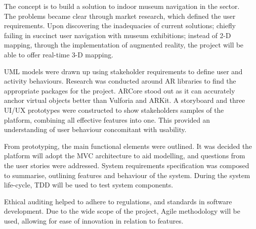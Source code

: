 
The concept is to build a solution to indoor museum navigation in the sector. The problems became clear through market research, which defined the user requirements. Upon discovering the inadequacies of current solutions; chiefly failing in succinct user navigation with museum exhibitions; instead of 2-D mapping, through the implementation of augmented reality, the project will be able to offer real-time 3-D mapping.

UML models were drawn up using stakeholder requirements to define user and activity behaviours. Research was conducted around AR libraries to find the appropriate packages for the project. ARCore stood out as it can accurately anchor virtual objects better than Vulforia and ARKit. A storyboard and three UI/UX prototypes were constructed to show stakeholders samples of the platform, combining all effective features into one. This provided an understanding of user behaviour concomitant with usability.  

From prototyping, the main functional elements were outlined. It was decided the platform will adopt the MVC architecture to aid modelling, and questions from the user stories were addressed. System requirements specification was composed to summarise, outlining features and behaviour of the system. During the system life-cycle, TDD will be used to test system components.  

Ethical auditing helped to adhere to regulations, and standards in software development. Due to the wide scope of the project, Agile methodology will be used, allowing for ease of innovation in relation to features.